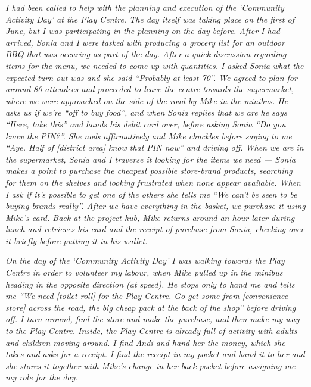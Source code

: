 \textit{I had been called to help with the planning and execution of the `Community Activity Day' at the Play Centre. The day itself was taking place on the first of June, but I was participating in the planning on the day before. After I had arrived, Sonia and I were tasked with producing a grocery list for an outdoor BBQ that was occuring as part of the day. After a quick discussion regarding items for the menu, we needed to come up with quantities. I asked Sonia what the expected turn out was and she said ``Probably at least 70''. We agreed to plan for around 80 attendees and proceeded to leave the centre towards the supermarket, where we were approached on the side of the road by Mike in the minibus. He asks us if we're ``off to buy food'', and when Sonia replies that we are he says ``Here, take this'' and hands his debit card over, before asking Sonia ``Do you know the PIN?''. She nods affirmatively and Mike chuckles before saying to me ``Aye. Half of [district area] know that PIN now'' and driving off. When we are in the supermarket, Sonia and I traverse it looking for the items we need --- Sonia makes a point to purchase the cheapest possible store-brand products, searching for them on the shelves and looking frustrated when none appear available. When I ask if it's possible to get one of the others she tells me ``We can't be seen to be buying brands really''. After we have everything in the basket, we purchase it using Mike's card. Back at the project hub, Mike returns around an hour later during lunch and retrieves his card and the receipt of purchase from Sonia, checking over it briefly before putting it in his wallet.}

\textit{On the day of the `Community Activity Day' I was walking towards the Play Centre in order to volunteer my labour, when Mike pulled up in the minibus heading in the opposite direction (at speed). He stops only to hand me  and tells me ``We need [toilet roll] for the Play Centre. Go get some from [convenience store] across the road, the big cheap pack at the back of the shop'' before driving off. I turn around, find the store and make the purchase, and then make my way to the Play Centre. Inside, the Play Centre is already full of activity with adults and children moving around. I find Andi and hand her the money, which she takes and asks for a receipt. I find the receipt in my pocket and hand it to her and she stores it together with Mike's change in her back pocket before assigning me my role for the day.}

